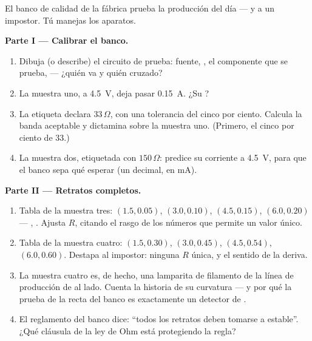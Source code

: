 \begin{problem}\label{pb:g8:ohms-law:1}
El banco de calidad de la fábrica prueba la producción del día --- y a
un impostor. Tú manejas los aparatos.

\medskip\noindent\textbf{Parte I --- Calibrar el banco.}
\begin{enumerate}
  \item Dibuja (o describe) el circuito de prueba: fuente,
        , el componente que se prueba,
         --- ¿quién va  y quién
        cruzado?
  \item La muestra uno, a \qty{4.5}{V}, deja pasar \qty{0.15}{A}.
        ¿Su ?
  \item La etiqueta declara $33\,\Omega$, con una tolerancia del
        cinco por ciento. Calcula la banda aceptable y dictamina
        sobre la muestra uno. (Primero, el cinco por ciento de
        $33$.)
  \item La muestra dos, etiquetada con $150\,\Omega$: predice su
        corriente a \qty{4.5}{V}, para que el banco sepa qué esperar
        (un decimal, en \unit{mA}).
\end{enumerate}

\medskip\noindent\textbf{Parte II --- Retratos completos.}
\begin{enumerate}[resume]
  \item Tabla de la muestra tres: $(1.5, 0.05)$, $(3.0, 0.10)$,
        $(4.5, 0.15)$, $(6.0, 0.20)$ --- ,
        . Ajusta $R$, citando el rasgo de los números
        que permite un valor único.
  \item Tabla de la muestra cuatro: $(1.5, 0.30)$, $(3.0, 0.45)$,
        $(4.5, 0.54)$, $(6.0, 0.60)$. Destapa al impostor: ninguna
        $R$ única, y el sentido de la deriva.
  \item La muestra cuatro es, de hecho, una lamparita de filamento
        de la línea de producción de al lado. Cuenta la historia de
        su curvatura --- y por qué la prueba de la recta del banco es
        exactamente un detector de .
  \item El reglamento del banco dice: ``todos los retratos deben
        tomarse a  estable''. ¿Qué cláusula de la
        ley de Ohm está protegiendo la regla?
\end{enumerate}


\end{problem}

